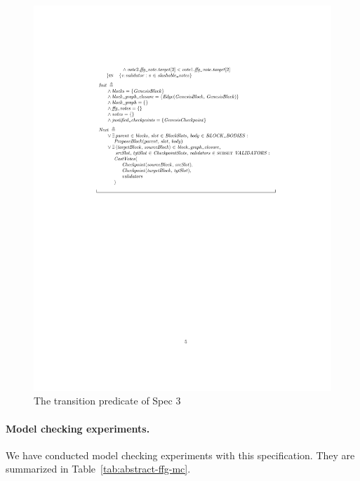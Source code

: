 \begin{figure}
    \centering
    \includegraphics[width=\textwidth]{images/abstract-ffg-next.pdf}  %
    \caption{The transition predicate of Spec 3}\label{fig:abstract-ffg-next}
\end{figure}

\paragraph{Model checking experiments.} We have conducted model checking
experiments with this specification. They are summarized in
Table~\ref{tab:abstract-ffg-mc}.

% 

